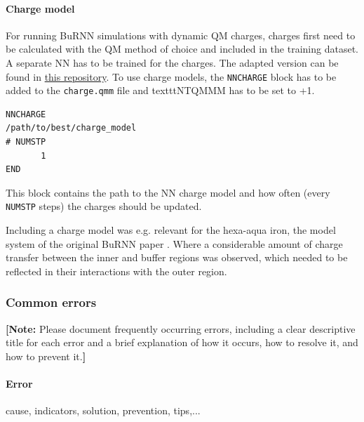 \paragraph{Charge model}
For running BuRNN simulations with dynamic QM charges, charges first need to be calculated with the QM method of choice and included in the training dataset. A separate NN has to be trained for the charges. The adapted version can be found in \href{https://github.com/juliawestermayr/schnetpack}{this repository}.
To use charge models, the \texttt{NNCHARGE} block has to be added to the \texttt{charge.qmm} file and texttt{NTQMMM} has to be set to +1. 

\begin{lstlisting}[breaklines=true, breakatwhitespace=false]
NNCHARGE
/path/to/best/charge_model
# NUMSTP
       1
END
\end{lstlisting}

This block contains the path to the NN charge model and how often (every \texttt{NUMSTP} steps) the charges should be updated.

Including a charge model was e.g. relevant for the hexa-aqua iron, the model system of the original BuRNN paper \cite{Lier2022BuRNN}. Where a considerable amount of charge transfer between the inner and buffer regions was observed, which needed to be reflected in their interactions with the outer region.



\subsubsection{Common errors}
\textbf{[Note:} Please document frequently occurring errors, including a clear descriptive title for each error and a brief explanation of how it occurs, how to resolve it, and how to prevent it.\textbf{]}

\paragraph{Error}
cause, indicators, solution, prevention, tips,...


